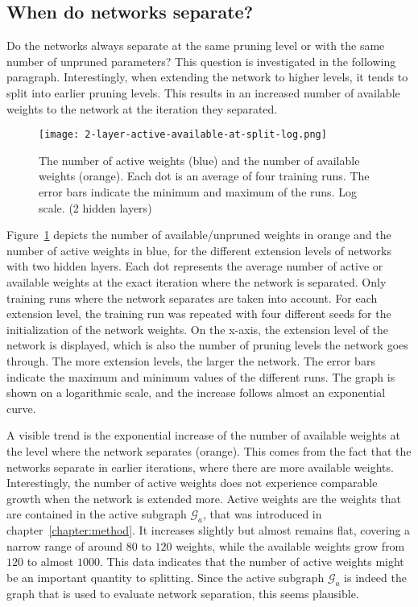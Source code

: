 \subsection{When do networks separate?}
Do the networks always separate at the same pruning level or with the same number of unpruned parameters?
This question is investigated in the following paragraph.
Interestingly, when extending the network to higher levels, it tends to split into earlier pruning levels.
This results in an increased number of available weights to the network at the iteration they separated.
\begin{figure}[ht] %
    \centering
    \texttt{[image: 2-layer-active-available-at-split-log.png]}
    \caption[Comparing active and available weights (2 hidden layers)]{
    The number of active weights (blue) and the number of available weights (orange).
    Each dot is an average of four training runs.
    The error bars indicate the minimum and maximum of the runs.
    Log scale. (2 hidden layers)
    }\label{fig:2l-active-split}
\end{figure}
Figure~\ref{fig:2l-active-split} depicts the number of available/unpruned weights in orange and the number of active weights in blue, for the different extension levels of networks with two hidden layers.
Each dot represents the average number of active or available weights at the exact iteration where the network is separated.
Only training runs where the network separates are taken into account.
For each extension level, the training run was repeated with four different seeds for the initialization of the network weights.
On the x-axis, the extension level of the network is displayed, which is also the number of pruning levels the network goes through.
The more extension levels, the larger the network.
The error bars indicate the maximum and minimum values of the different runs.
The graph is shown on a logarithmic scale, and the increase follows almost an exponential curve.

A visible trend is the exponential increase of the number of available weights at the level where the network separates (orange).
This comes from the fact that the networks separate in earlier iterations, where there are more available weights.
Interestingly, the number of active weights does not experience comparable growth when the network is extended more.
Active weights are the weights that are contained in the active subgraph $\mathcal{G}_a$, that was introduced in chapter~\ref{chapter:method}.
It increases slightly but almost remains flat, covering a narrow range of around $80$ to $120$ weights, while the available weights grow from $120$ to almost $1000$.
This data indicates that the number of active weights might be an important quantity to splitting.
Since the active subgraph $\mathcal{G}_a$ is indeed the graph that is used to evaluate network separation, this seems plausible.
 
